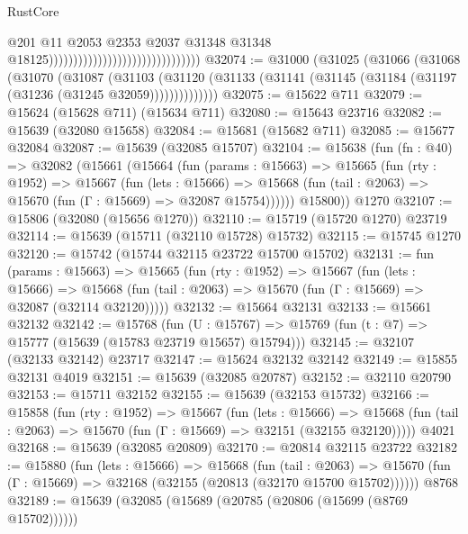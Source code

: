 \begin{lexlean}{RustCore}
\begin{coremodule}
                                                                  @201
                                                                  @11
                                                                  @2053
                                                                  @2353
                                                                  @2037
                                                                  @31348
                                                                  @31348
                                                                  @18125)))))))))))))))))))))))))))))))
@32074 := @31000
    (@31025
      (@31066
        (@31068
          (@31070
            (@31087
              (@31103
                (@31120 (@31133 (@31141 (@31145 (@31184 (@31197 (@31236 (@31245 @32059))))))))))))))
@32075 := @15622 @711
@32079 := @15624 (@15628 @711) (@15634 @711)
@32080 := @15643 @23716
@32082 := @15639 (@32080 @15658)
@32084 := @15681 (@15682 @711)
@32085 := @15677 @32084
@32087 := @15639 (@32085 @15707)
@32104 := @15638
    (fun (fn : @40) =>
    @32082
      (@15661
        (@15664
          (fun (params : @15663) =>
          @15665
            (fun (rty : @1952) =>
            @15667
              (fun (lets : @15666) =>
              @15668 (fun (tail : @2063) => @15670 (fun (Γ : @15669) => @32087 @15754))))))
        @15800))
    @1270
@32107 := @15806 (@32080 (@15656 @1270))
@32110 := @15719 (@15720 @1270) @23719
@32114 := @15639 (@15711 (@32110 @15728) @15732)
@32115 := @15745 @1270
@32120 := @15742 (@15744 @32115 @23722 @15700 @15702)
@32131 := fun (params : @15663) =>
  @15665
    (fun (rty : @1952) =>
    @15667
      (fun (lets : @15666) =>
      @15668 (fun (tail : @2063) => @15670 (fun (Γ : @15669) => @32087 (@32114 @32120)))))
@32132 := @15664 @32131
@32133 := @15661 @32132
@32142 := @15768
    (fun (U : @15767) => @15769 (fun (t : @7) => @15777 (@15639 (@15783 @23719 @15657) @15794)))
@32145 := @32107 (@32133 @32142) @23717
@32147 := @15624 @32132 @32142
@32149 := @15855 @32131 @4019
@32151 := @15639 (@32085 @20787)
@32152 := @32110 @20790
@32153 := @15711 @32152
@32155 := @15639 (@32153 @15732)
@32166 := @15858
    (fun (rty : @1952) =>
    @15667
      (fun (lets : @15666) =>
      @15668 (fun (tail : @2063) => @15670 (fun (Γ : @15669) => @32151 (@32155 @32120)))))
    @4021
@32168 := @15639 (@32085 @20809)
@32170 := @20814 @32115 @23722
@32182 := @15880
    (fun (lets : @15666) =>
    @15668
      (fun (tail : @2063) =>
      @15670 (fun (Γ : @15669) => @32168 (@32155 (@20813 (@32170 @15700 @15702))))))
    @8768
@32189 := @15639 (@32085 (@15689 (@20785 (@20806 (@15699 (@8769 @15702))))))

\end{coremodule}
\end{lexlean}

